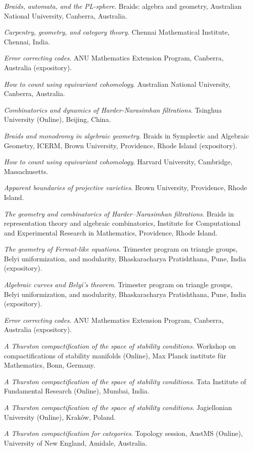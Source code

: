 \documentclass[11pt]{article}
\begin{document}
\begin{description}
\emph{Braids, automata, and the PL-sphere}.
Braids: algebra and geometry, Australian National University, Canberra, Australia.
\item[{2022}] \emph{Carpentry, geometry, and category theory}.
Chennai Mathematical Institute, Chennai, India.

\emph{Error correcting codes}.
ANU Mathematics Extension Program, Canberra, Australia (expository).

\emph{How to count using equivariant cohomology}.
Australian National University, Canberra, Australia.

\emph{Combinatorics and dynamics of Harder-Narasimhan filtrations}.
Tsinghua University (Online), Beijing, China.

\emph{Braids and monodromy in algebraic geometry}.
Braids in Symplectic and Algebraic Geometry, ICERM, Brown University, Providence, Rhode Island (expository).

\emph{How to count using equivariant cohomology}.
Harvard University, Cambridge, Massachusetts.

\emph{Apparent boundaries of projective varieties}.
Brown University, Providence, Rhode Island.

\emph{The geometry and combinatorics of Harder--Narasimhan filtrations}.
Braids in representation theory and algebraic combinatorics, Institute for Computational and Experimental Research in Mathematics, Providence, Rhode Island.

\emph{The geometry of Fermat-like equations}.
Trimester program on triangle groups, Belyi uniformization, and modularity, Bhaskaracharya Pratishthana, Pune, India (expository).
\item[{2021}] \emph{Algebraic curves and Belyi's theorem}.
Trimester program on triangle groups, Belyi uniformization, and modularity, Bhaskaracharya Pratishthana, Pune, India (expository).

\emph{Error correcting codes}.
ANU Mathematics Extension Program, Canberra, Australia (expository).

\emph{A Thurston compactification of the space of stability conditions}.
Workshop on compactifications of stability manifolds (Online), Max Planck institute für Mathematics, Bonn, Germany.

\emph{A Thurston compactification of the space of stability conditions}.
Tata Institute of Fundamental Research (Online), Mumbai, India.

\emph{A Thurston compactification of the space of stability conditions}.
Jagiellonian University (Online), Kraków, Poland.
\item[{2020}] \emph{A Thurston compactification for categories}.
Topology session, AustMS (Online), University of New England, Amidale, Australia.


\end{description}
\end{document}
